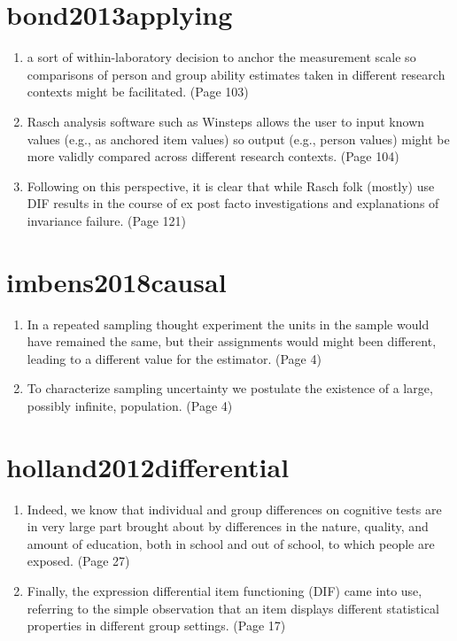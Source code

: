 \documentclass[11pt]{article}
\begin{document}
\section{bond2013applying}

\begin{enumerate}
  \item a sort of within-laboratory decision to anchor the measurement scale so comparisons of person and group ability estimates taken in different research contexts might be facilitated. (Page 103)
  \item Rasch analysis software such as Winsteps allows the user to input known values (e.g., as anchored item values) so output (e.g., person values) might be more validly compared across different research contexts. (Page 104)
  \item Following on this perspective, it is clear that while Rasch folk (mostly) use DIF results in the course of ex post facto investigations and explanations of invariance failure. (Page 121)
\end{enumerate}

\section{imbens2018causal}

\begin{enumerate}
  \item In a repeated sampling thought experiment the units in the sample would have remained the same, but their assignments would might been different, leading to a different value for the estimator. (Page 4)
  \item To characterize sampling uncertainty we postulate the existence of a large, possibly infinite, population. (Page 4)
 
\end{enumerate}

\section{holland2012differential}

\begin{enumerate}
  \item Indeed, we know that individual and group differences on cognitive tests are in very large part brought about by differences in the nature, quality, and amount of education, both in school and out of school, to which people are exposed. (Page 27)
  \item Finally, the expression differential item functioning (DIF) came into use, referring to the simple observation that an item displays different statistical properties in different group settings. (Page 17)
\end{enumerate}
\end{document}
